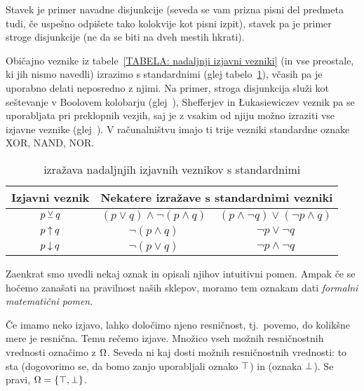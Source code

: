 		\begin{zgled}
			Stavek  je primer navadne disjunkcije (seveda se vam prizna pisni del predmeta tudi, če uspešno odpišete tako kolokvije kot pisni izpit), stavek  pa je primer stroge disjunkcije (ne da se biti na dveh mestih hkrati).
		\end{zgled}
		
		Običajno veznike iz tabele~\ref{TABELA: nadaljnji izjavni vezniki} (in vse preostale, ki jih nismo navedli) izrazimo s standardnimi (glej tabelo~\ref{TABELA: izražava nadaljnjih izjavnih veznikov s standardnimi}), včasih pa je uporabno delati neposredno z njimi. Na primer, stroga disjunkcija služi kot seštevanje v Boolovem kolobarju (glej~), Shefferjev in Łukasiewiczev veznik pa se uporabljata pri preklopnih vezjih, saj je z vsakim od njiju možno izraziti vse izjavne veznike (glej~). V računalništvu imajo ti trije vezniki standardne oznake XOR, NAND, NOR.
		
		\begin{table}[!ht]
			\centering
			\begin{tabular}{|ccc|}
				\hline
				\textbf{Izjavni veznik} & \multicolumn{2}{c|}{\textbf{Nekatere izražave s standardnimi vezniki}} \\
				\hline
				$p \mathbin{\veebar} q$ & $(p \lor q) \land \lnot(p \land q)$ & $(p \land \lnot{q}) \lor (\lnot{p} \land q)$ \\
				$p \mathbin{\uparrow} q$ & $\lnot(p \land q)$ & $\lnot{p} \lor \lnot{q}$ \\
				$p \mathbin{\downarrow} q$ & $\lnot(p \lor q)$ & $\lnot{p} \land \lnot{q}$ \\
				\hline
			\end{tabular}
			\caption{izražava nadaljnjih izjavnih veznikov s standardnimi}\label{TABELA: izražava nadaljnjih izjavnih veznikov s standardnimi}
		\end{table}
		
		
		Zaenkrat smo uvedli nekaj oznak in opisali njihov intuitivni pomen. Ampak če se hočemo zanašati na pravilnost naših sklepov, moramo tem oznakam dati \emph{formalni matematični pomen}.
		
		Če imamo neko izjavo, lahko določimo njeno resničnost, tj.~povemo, do kolikšne mere je resnična. Temu rečemo  izjave. Množico vseh možnih resničnostnih vrednosti označimo z $\Omega$. Seveda ni kaj dosti možnih resničnostnih vrednosti: to sta  (dogovorimo se, da bomo zanjo uporabljali oznako $\top$) in  (oznaka $\bot$). Se pravi, $\tvs = \set{\true, \false}$.
		
